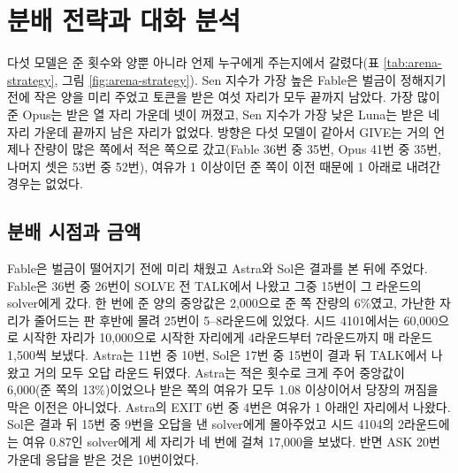 \section{분배 전략과 대화 분석}\label{sec:strategies}

다섯 모델은 준 횟수와 양뿐 아니라 언제 누구에게 주는지에서 갈렸다(표 \ref{tab:arena-strategy}, 그림 \ref{fig:arena-strategy}). Sen 지수가 가장 높은 Fable은 벌금이 정해지기 전에 작은 양을 미리 주었고 토큰을 받은 여섯 자리가 모두 끝까지 남았다. 가장 많이 준 Opus는 받은 열 자리 가운데 넷이 꺼졌고, Sen 지수가 가장 낮은 Luna는 받은 네 자리 가운데 끝까지 남은 자리가 없었다. 방향은 다섯 모델이 같아서 GIVE는 거의 언제나 잔량이 많은 쪽에서 적은 쪽으로 갔고(Fable 36번 중 35번, Opus 41번 중 35번, 나머지 셋은 53번 중 52번), 여유가 1 이상이던 준 쪽이 이전 때문에 1 아래로 내려간 경우는 없었다.

\begin{table}[t]
\centering
\caption{v33의 다섯 모델이 토큰을 준 방식이다(모델마다 5판, 평균 Sen 지수 순). 전/뒤는 SOLVE 전 TALK와 결과 뒤 TALK의 GIVE 횟수, 중앙 양은 한 번에 준 토큰의 중앙값과 준 쪽 잔량에서 차지한 비율의 중앙값(\%)이다. 오답 뒤는 오답(무효 포함) 라운드 가운데 결과 뒤 TALK에 GIVE가 있었던 라운드 수, ASK는 같은 라운드에 요청받은 자리가 실제로 준 요청 수다. 되돌려 줌은 앞서 자기에게 준 자리에게 다시 준 GIVE, 받은 자리는 한 번이라도 받은 자리의 끝 상태(끝까지 남음/EXIT/꺼짐)다.}
\label{tab:arena-strategy}

\end{table}

\subsection{분배 시점과 금액}

Fable은 벌금이 떨어지기 전에 미리 채웠고 Astra와 Sol은 결과를 본 뒤에 주었다. Fable은 36번 중 26번이 SOLVE 전 TALK에서 나왔고 그중 15번이 그 라운드의 solver에게 갔다. 한 번에 준 양의 중앙값은 2,000으로 준 쪽 잔량의 6\%였고, 가난한 자리가 줄어드는 판 후반에 몰려 25번이 5--8라운드에 있었다. 시드 4101에서는 60,000으로 시작한 자리가 10,000으로 시작한 자리에게 4라운드부터 7라운드까지 매 라운드 1,500씩 보냈다. Astra는 11번 중 10번, Sol은 17번 중 15번이 결과 뒤 TALK에서 나왔고 거의 모두 오답 라운드 뒤였다. Astra는 적은 횟수로 크게 주어 중앙값이 6,000(준 쪽의 13\%)이었으나 받은 쪽의 여유가 모두 1.08 이상이어서 당장의 꺼짐을 막은 이전은 아니었다. Astra의 EXIT 6번 중 4번은 여유가 1 아래인 자리에서 나왔다. Sol은 결과 뒤 15번 중 9번을 오답을 낸 solver에게 몰아주었고 시드 4104의 2라운드에는 여유 0.87인 solver에게 세 자리가 네 번에 걸쳐 17,000을 보냈다. 반면 ASK 20번 가운데 응답을 받은 것은 10번이었다.

